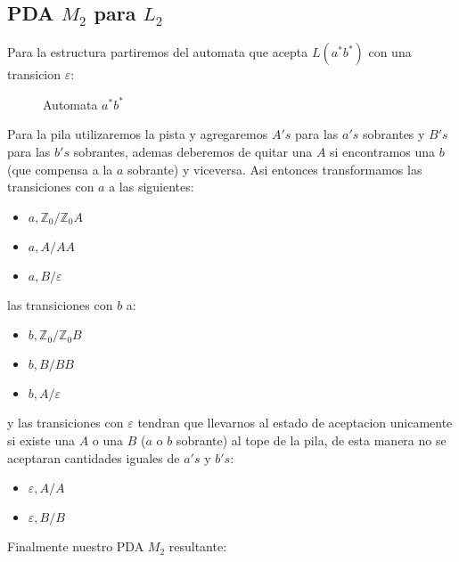 \documentclass[spanish]{article}
\begin{document}
\subsection{PDA $M_2$ para $L_2$}
  Para la estructura partiremos del automata que acepta $L(a^*b^*)$ con una transicion $\varepsilon$:
  \begin{figure}[H]
    \centering
    \label{fig:figura3}
    \caption{Automata $a^*b^*$}
  \end{figure}
  Para la pila utilizaremos la pista y agregaremos $A's$ para las $a's$ sobrantes y $B's$
  para las $b's$ sobrantes, ademas deberemos de quitar una $A$ si encontramos una $b$ (que compensa a la $a$ sobrante) y viceversa.
  Asi entonces transformamos las transiciones con $a$ a las siguientes:
  \begin{itemize}
    \item $a, \mathbb{Z}_0 / \mathbb{Z}_0 A$
    \item $a, A / AA$
    \item $a, B / \varepsilon$
  \end{itemize}
  las transiciones con $b$ a:
  \begin{itemize}
    \item $b, \mathbb{Z}_0 / \mathbb{Z}_0 B$
    \item $b, B / BB$
    \item $b, A / \varepsilon$
  \end{itemize}
  y las transiciones con $\varepsilon$ tendran que llevarnos al estado
  de aceptacion unicamente si existe una $A$ o una $B$ ($a$ o $b$ sobrante)
  al tope de la pila, de esta manera no se aceptaran cantidades iguales de $a's$ y $b's$:
  \begin{itemize}
    \item $\varepsilon, A / A$
    \item $\varepsilon, B/ B$
  \end{itemize}
  Finalmente nuestro PDA $M_2$ resultante:
\end{document}
